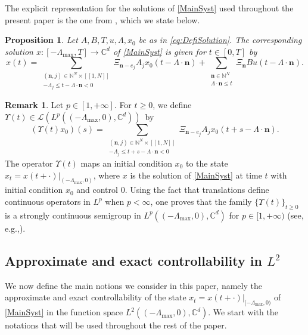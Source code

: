 \documentclass[JEP,XML,SOM,Unicode]{cedram}
\renewcommand{\eg}{e.g.,\xspace}
\newcommand{\bn}{\boldsymbol{n}}
\newcommand{\llbracket}{[\![}
\newcommand{\rrbracket}{]\!]}
\theoremstyle{plain}
\newtheorem{prop}[theo]{Proposition}
\theoremstyle{definition}
\newtheorem{remk}[theo]{Remark}
\begin{document}
The explicit representation for the solutions of \eqref{MainSyst} used throughout the present paper is the one from \cite[Prop.\,2.7]{Mazanti2017Relative}, which we state below.

\begin{prop}
\label{PropExplicit}
Let
$A,B,T,u,\Lambda,x_0$ be as in \eqref{eq:DefiSolution}.
The corresponding solution $x: \left[-\Lambda_{\max}, T\right] \to \mathbb C^d$ of \eqref{MainSyst} is given for $t \in [0, T]$ by
\begin{equation}%
x(t) = \sum_{\substack{(\bn, j) \in \mathbb N^N \times \llbracket 1, N\rrbracket \\ -\Lambda_j \leq t - \Lambda \cdot \bn < 0}} \Xi_{\bn - e_j} A_j x_0(t - \Lambda \cdot \bn) + \sum_{\substack{\bn \in \mathbb N^N \\ \Lambda \cdot \bn \leq t}} \Xi_{\bn} B u(t - \Lambda \cdot \bn).
\end{equation}
\end{prop}

\begin{remk}
\label{RemkSemigroup}
Let $p\!\in\![1, +\infty]$. For $t\!\geq\!0$, we define $\Upsilon(t)\!\in\!\mathcal L(L^p((-\Lambda_{\max}, 0), \mathbb C^d))$~by
\[
(\Upsilon(t)x_0)(s) = \sum_{\substack{(\bn, j) \in \mathbb N^N \times \llbracket 1, N\rrbracket \\ -\Lambda_j \leq t + s - \Lambda \cdot \bn < 0}} \Xi_{\bn - e_j} A_j x_0(t + s - \Lambda \cdot \bn).
\]
The operator $\Upsilon(t)$ maps an initial condition $x_0$ to the state $x_t = \left.x(t + \cdot)\right|_{(-\Lambda_{\max}, 0)}$, where $x$ is the solution of \eqref{MainSyst} at time $t$ with initial condition $x_0$ and control $0$. Using the fact that translations define continuous operators in $L^p$ when $p < \infty$, one proves that the family $\{\Upsilon(t)\}_{t \geq 0}$ is a strongly continuous semigroup in $L^p((-\Lambda_{\max}, 0), \mathbb C^d)$ for $p \in [1, +\infty)$ (see, \eg \cite[Prop.\,3.5]{Chitour2016Stability}).
\end{remk}

\subsection{Approximate and exact controllability in \texorpdfstring{$L^2$}{L2}}
\label{SecControlL2}

We now define the main \hbox{notions} we consider in this paper, namely the approximate and exact controllability of the state $x_t = \left.x(t + \cdot)\right|_{[-\Lambda_{\max}, 0)}$ of \eqref{MainSyst} in the function space $L^2((-\Lambda_{\max}, 0), \mathbb C^d)$. We start with the notations that will be used throughout the rest of the paper.
\end{document}
